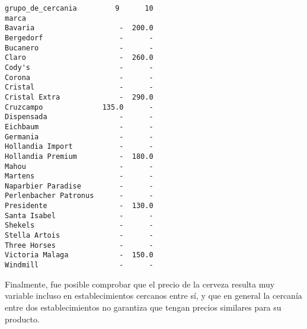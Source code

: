 \begin{verbatim}
grupo_de_cercania         9      10  
marca                                
Bavaria                    -  200.0  
Bergedorf                  -      -  
Bucanero                   -      -  
Claro                      -  260.0  
Cody's                     -      -  
Corona                     -      -  
Cristal                    -      -  
Cristal Extra              -  290.0  
Cruzcampo              135.0      -  
Dispensada                 -      -  
Eichbaum                   -      -  
Germania                   -      -  
Hollandia Import           -      -  
Hollandia Premium          -  180.0  
Mahou                      -      -  
Martens                    -      -  
Naparbier Paradise         -      -  
Perlenbacher Patronus      -      -  
Presidente                 -  130.0  
Santa Isabel               -      -  
Shekels                    -      -  
Stella Artois              -      -  
Three Horses               -      -  
Victoria Malaga            -  150.0  
Windmill                   -      -  
\end{verbatim}

Finalmente, fue posible comprobar que el precio de la cerveza resulta
muy variable incluso en establecimientos cercanos entre sí, y que en
general la cercanía entre dos establecimientos no garantiza que tengan
precios similares para su producto.



